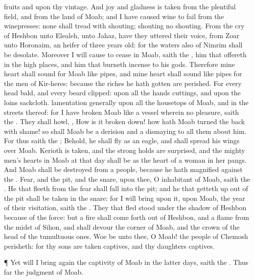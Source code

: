 {fruits and upon thy
vintage.
And
joy and
gladness is
taken from the plentiful
field, and from the
land of
Moab; and I have caused
wine to
fail from the
winepresses: none shall
tread with
shouting;
{}
shouting
{} no
shouting.
From the
cry of
Heshbon
{} unto
Elealeh,
{} unto
Jahaz, have they
uttered their
voice, from
Zoar
{} unto
Horonaim,
{} an
heifer of three years
old: for the
waters also of
Nimrim shall be
desolate.
Moreover I will cause to
cease in
Moab,
saith the
{}, him that
offereth in the high
places, and him that burneth
incense to his
gods.
Therefore mine
heart shall
sound for
Moab like
pipes, and mine
heart shall
sound like
pipes for the
men of
Kir-heres: because the
riches
{} he hath
gotten are
perished.
For every
head
{}
bald, and every
beard
clipped: upon all the
hands
{}
cuttings, and upon the
loins
sackcloth.
lamentation generally upon all the
housetops of
Moab, and in the
streets thereof: for I have
broken
Moab like a
vessel wherein
{} no
pleasure,
saith the
{}.
They shall
howl,
{}, How is it broken
down! how hath
Moab
turned the
back with
shame! so shall
Moab be a
derision and a
dismaying to all them
about him.
For thus
saith the
{}; Behold, he shall
fly as an
eagle, and shall
spread his
wings over
Moab.
Kerioth is
taken, and the strong
holds are
surprised, and the mighty
men’s
hearts in
Moab at that
day shall be as the
heart of a
woman in her
pangs.
And
Moab shall be
destroyed from
{} a
people, because he hath
magnified
{} against the
{}.
Fear, and the
pit, and the
snare,
{} upon thee, O
inhabitant of
Moab,
saith the
{}.
He that
fleeth
from the
fear shall
fall into the
pit; and he that getteth
up out of the
pit shall be
taken in the
snare: for I will
bring upon it,
{} upon
Moab, the
year of their
visitation,
saith the
{}.
They that
fled
stood under the
shadow of
Heshbon because of the
force: but a
fire shall come
forth out of
Heshbon, and a
flame from the
midst of
Sihon, and shall
devour the
corner of
Moab, and the crown of the
head of the
tumultuous
ones.
Woe be unto thee, O
Moab! the
people of
Chemosh
perisheth: for thy
sons are
taken
captives, and thy
daughters
captives.
\par }{\PP {}¶ Yet will I bring
again the
captivity of
Moab in the
latter
days,
saith the
{}. Thus
far
{} the
judgment of
Moab.

}
